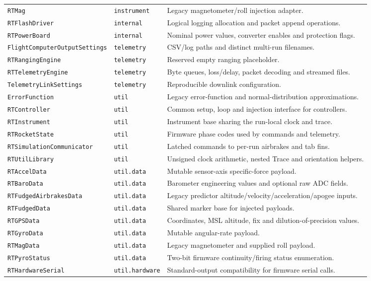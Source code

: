\documentclass[10pt,letterpaper]{article}
\newcommand{\code}[1]{\nolinkurl{#1}}
\newcommand{\class}[1]{\nolinkurl{#1}}
\begin{document}
\begin{longtable}{@{}>{\raggedright\arraybackslash}p{5.65cm}>{\raggedright\arraybackslash}p{2.1cm}>{\raggedright\arraybackslash}p{7.4cm}@{}}
\class{RTMag} & \code{instrument} & Legacy magnetometer/roll injection adapter.\\
\class{RTFlashDriver} & \code{internal} & Logical logging allocation and packet append operations.\\
\class{RTPowerBoard} & \code{internal} & Nominal power values, converter enables and protection flags.\\
\class{FlightComputerOutputSettings} & \code{telemetry} & CSV/log paths and distinct multi-run filenames.\\
\class{RTRangingEngine} & \code{telemetry} & Reserved empty ranging placeholder.\\
\class{RTTelemetryEngine} & \code{telemetry} & Byte queues, loss/delay, packet decoding and streamed files.\\
\class{TelemetryLinkSettings} & \code{telemetry} & Reproducible downlink configuration.\\
\pagebreak
\class{ErrorFunction} & \code{util} & Legacy error-function and normal-distribution approximations.\\
\class{RTController} & \code{util} & Common setup, loop and injection interface for controllers.\\
\class{RTInstrument} & \code{util} & Instrument base sharing the run-local clock and trace.\\
\class{RTRocketState} & \code{util} & Firmware phase codes used by commands and telemetry.\\
\class{RTSimulationCommunicator} & \code{util} & Latched commands to per-run airbrakes and tab fins.\\
\class{RTUtilLibrary} & \code{util} & Unsigned clock arithmetic, nested Trace and orientation helpers.\\
\class{RTAccelData} & \code{util.data} & Mutable sensor-axis specific-force payload.\\
\class{RTBaroData} & \code{util.data} & Barometer engineering values and optional raw ADC fields.\\
\class{RTFudgedAirbrakesData} & \code{util.data} & Legacy predictor altitude/velocity/acceleration/apogee inputs.\\
\class{RTFudgedData} & \code{util.data} & Shared marker base for injected payloads.\\
\class{RTGPSData} & \code{util.data} & Coordinates, MSL altitude, fix and dilution-of-precision values.\\
\class{RTGyroData} & \code{util.data} & Mutable angular-rate payload.\\
\class{RTMagData} & \code{util.data} & Legacy magnetometer and supplied roll payload.\\
\class{RTPyroStatus} & \code{util.data} & Two-bit firmware continuity/firing status enumeration.\\
\class{RTHardwareSerial} & \code{util.}\newline\code{hardware} & Standard-output compatibility for firmware serial calls.\\
\end{longtable}
\normalsize
\end{document}
